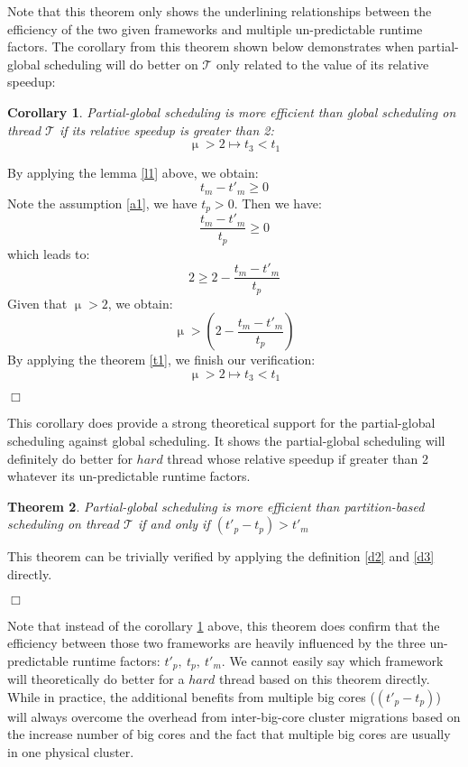 \documentclass[pageno]{jpaper}
\newtheorem{theorem}{\bf Theorem}
\newenvironment{proof}{\par \noindent {\bf Proof:}}{\begin{flushright}$\Box$\end{flushright}\par \noindent}
\newtheorem{corollary}[theorem]{\bf Corollary}
\begin{document}
Note that this theorem only shows the underlining relationships between the efficiency of the two given frameworks and multiple un-predictable runtime factors. The corollary from this theorem shown below demonstrates when partial-global scheduling will do better on $\mathcal{T}$ only related to the value of its relative speedup:

\begin{corollary} \label{c1} Partial-global scheduling is more efficient than global scheduling on thread $\mathcal{T}$ if its relative speedup is greater than 2:
$$\upmu > 2 \mapsto t_3 < t_1  $$
\end{corollary}

\begin{proof}
By applying the lemma \ref{l1} above, we obtain: $$ t_m - t'_m \geq 0$$ Note the assumption \ref{a1}, we have $t_p > 0$. Then we have: $$ \frac{t_m - t'_m}{t_p} \geq 0$$ which leads to: $$2 \geq 2 - \frac{t_m - t'_m}{t_p}$$ Given that $\upmu > 2$, we obtain: $$\upmu > (2-\frac{t_m - t'_m}{t_p}) $$ By applying the theorem \ref{t1}, we finish our verification: $$\upmu > 2 \mapsto t_3 < t_1  $$
\end{proof}

This corollary does provide a strong theoretical support for the partial-global scheduling against global scheduling. It shows the partial-global scheduling will definitely do better for $hard$ thread whose relative speedup if greater than 2 whatever its un-predictable runtime factors.

\begin{theorem}  \label{t2}  Partial-global scheduling is more efficient than partition-based scheduling on thread $\mathcal{T}$ if and only if $(t'_p - t_p) > t'_m$
\end{theorem} 

\begin{proof} 
This theorem can be trivially verified by applying the definition \ref{d2} and \ref{d3} directly.
\end{proof}
Note that instead of the corollary \ref{c1} above, this theorem does confirm that the efficiency between those two frameworks are heavily influenced by the three un-predictable runtime factors: $t'_p,\ t_p,\ t'_m$. We cannot easily say which framework will theoretically do better for a $hard$ thread based on this theorem directly. While in practice,  the additional benefits from multiple big cores ($(t'_p - t_p)$) will always overcome the overhead from inter-big-core cluster migrations based on the increase number of big cores and the fact that multiple big cores are usually in one physical cluster. 
\end{document}
